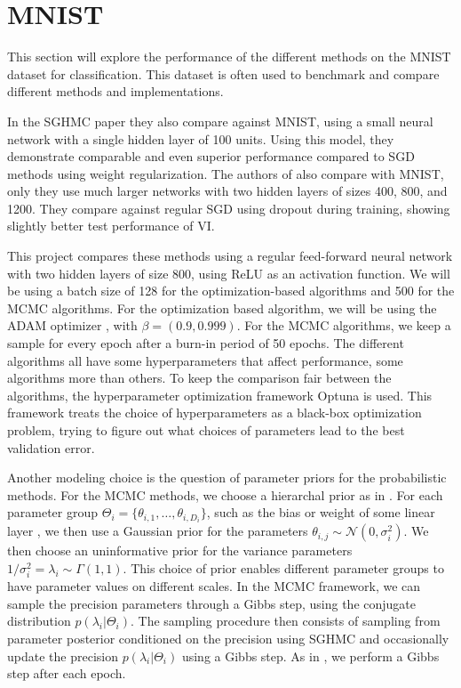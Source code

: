 \section{MNIST}
This section will explore the performance of the different methods on the MNIST dataset for classification. 
This dataset is often used to benchmark and compare different methods and implementations. 

In the SGHMC paper \cite{chen_stochastic_2014} they also compare against MNIST, using a small neural network with a single hidden layer of 100 units.
Using this model, they demonstrate comparable and even superior performance compared to SGD methods using weight regularization.
The authors of \cite{blundell_weight_2015} also compare with MNIST, only they use much larger networks with two hidden layers of sizes 400, 800, and 1200. 
They compare against regular SGD using dropout during training, showing slightly better test performance of VI.

This project compares these methods using a regular feed-forward neural network with two hidden layers of size 800, using ReLU as an activation function. 
We will be using a batch size of 128 for the optimization-based algorithms and 500 for the MCMC algorithms.
For the optimization based algorithm, we will be using the ADAM optimizer \cite{kingma_adam_2017}, with $\beta=(0.9, 0.999)$.
For the MCMC algorithms, we keep a sample for every epoch after a burn-in period of 50 epochs.
The different algorithms all have some hyperparameters that affect performance, some algorithms more than others.
To keep the comparison fair between the algorithms, the hyperparameter optimization framework Optuna \cite{akiba_optuna_2019} is used. 
This framework treats the choice of hyperparameters as a black-box optimization problem, trying to figure out what choices of parameters lead to the best validation error.

Another modeling choice is the question of parameter priors for the probabilistic methods. 
For the MCMC methods, we choose a hierarchal prior as in \cite{chen_stochastic_2014}. 
For each parameter group $\Theta_i=\{\theta_{i,1},\dots,\theta_{i,D_i}\}$, such as the bias or weight of some linear layer , we then use a Gaussian prior for the parameters $\theta_{i,j} \sim  \mathcal{N}(0, \sigma_i^2)$.
We then choose an uninformative prior for the variance parameters $1/\sigma_i^2 = \lambda_i \sim \Gamma(1,1)$.
This choice of prior enables different parameter groups to have parameter values on different scales.
In the MCMC framework, we can sample the precision parameters through a Gibbs step, using the conjugate distribution $p(\lambda_i | \Theta_i)$.
The sampling procedure then consists of sampling from parameter posterior conditioned on the precision using SGHMC and occasionally update the precision $p(\lambda_i | \Theta_i)$ using a Gibbs step.
As in \cite{chen_stochastic_2014}, we perform a Gibbs step after each epoch.

